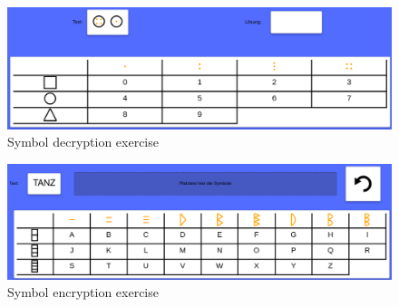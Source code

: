 \begin{figure} 
  \centering
  \includegraphics[width=1.0 \columnwidth]{figures/symbol_decrypt.png}
  \caption{Symbol decryption exercise} 
  \label{fig:symbolDecryption} 
\end{figure}

\begin{figure} 
  \centering
  \includegraphics[width=1.0 \columnwidth]{figures/symbol_encrypt.png}
  \caption{Symbol encryption exercise} 
  \label{fig:symbolEncryption} 
\end{figure}

